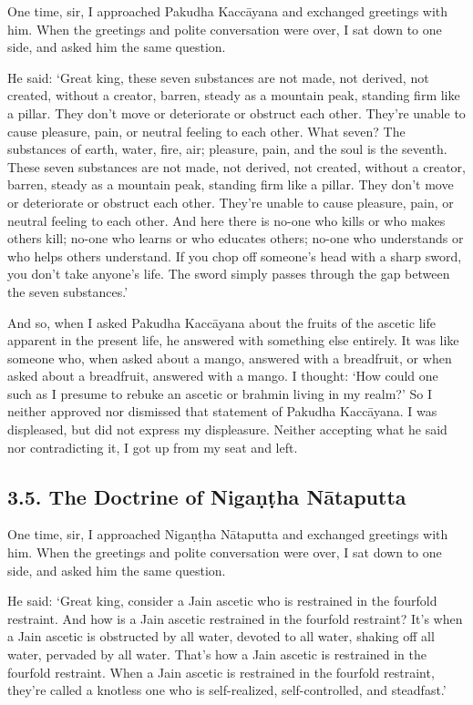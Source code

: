 \documentclass[12pt,openany]{book}%
\begin{document}
One time, sir, I approached Pakudha \textsanskrit{Kaccāyana} and exchanged greetings with him. When the greetings and polite conversation were over, I sat down to one side, and asked him the same question. 

He said: ‘Great king, these seven substances are not made, not derived, not created, without a creator, barren, steady as a mountain peak, standing firm like a pillar. They don’t move or deteriorate or obstruct each other. They’re unable to cause pleasure, pain, or neutral feeling to each other. What seven? The substances of earth, water, fire, air; pleasure, pain, and the soul is the seventh. These seven substances are not made, not derived, not created, without a creator, barren, steady as a mountain peak, standing firm like a pillar. They don’t move or deteriorate or obstruct each other. They’re unable to cause pleasure, pain, or neutral feeling to each other. And here there is no-one who kills or who makes others kill; no-one who learns or who educates others; no-one who understands or who helps others understand. If you chop off someone’s head with a sharp sword, you don’t take anyone’s life. The sword simply passes through the gap between the seven substances.’ 

And so, when I asked Pakudha \textsanskrit{Kaccāyana} about the fruits of the ascetic life apparent in the present life, he answered with something else entirely. It was like someone who, when asked about a mango, answered with a breadfruit, or when asked about a breadfruit, answered with a mango. I thought: ‘How could one such as I presume to rebuke an ascetic or brahmin living in my realm?’ So I neither approved nor dismissed that statement of Pakudha \textsanskrit{Kaccāyana}. I was displeased, but did not express my displeasure. Neither accepting what he said nor contradicting it, I got up from my seat and left. 

\subsection*{3.5. The Doctrine of \textsanskrit{Nigaṇṭha} \textsanskrit{Nātaputta} }

One time, sir, I approached \textsanskrit{Nigaṇṭha} \textsanskrit{Nātaputta} and exchanged greetings with him. When the greetings and polite conversation were over, I sat down to one side, and asked him the same question. 

He said: ‘Great king, consider a Jain ascetic who is restrained in the fourfold restraint. And how is a Jain ascetic restrained in the fourfold restraint? It’s when a Jain ascetic is obstructed by all water, devoted to all water, shaking off all water, pervaded by all water. That’s how a Jain ascetic is restrained in the fourfold restraint. When a Jain ascetic is restrained in the fourfold restraint, they’re called a knotless one who is self-realized, self-controlled, and steadfast.’ 
\end{document}
